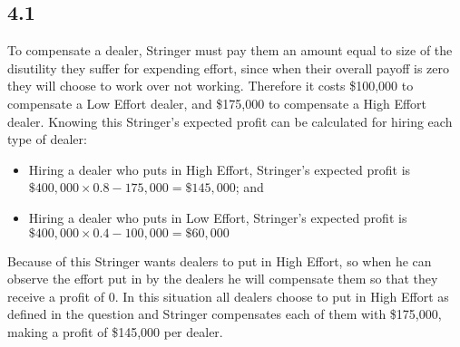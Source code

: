 \documentclass{article}
\begin{document}
\subsection*{4.1}
To compensate a dealer, Stringer must pay them an amount equal to size of the disutility they suffer for expending effort, since when their overall payoff is zero they will choose to work over not working. Therefore it costs \$100,000 to compensate a Low Effort dealer, and \$175,000 to compensate a High Effort dealer. Knowing this Stringer's expected profit can be calculated for hiring each type of dealer:
\begin{itemize}
    \item Hiring a dealer who puts in High Effort, Stringer's expected profit is $\$400,000 \times 0.8 - 175,000 = \$145,000$; and
    \item Hiring a dealer who puts in Low Effort, Stringer's expected profit is $\$400,000 \times 0.4 - 100,000 = \$60,000$
\end{itemize}
Because of this Stringer wants dealers to put in High Effort, so when he can observe the effort put in by the dealers he will compensate them so that they receive a profit of 0. In this situation all dealers choose to put in High Effort as defined in the question and Stringer compensates each of them with \$175,000, making a profit of \$145,000 per dealer.
\end{document}
